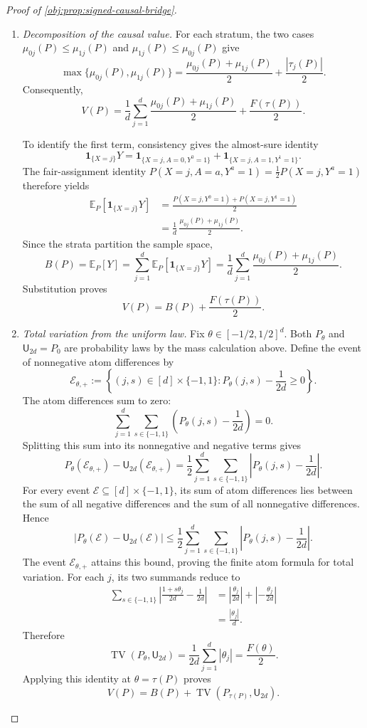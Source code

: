 \begin{proof}[Proof of \cref{obj:prop:signed-causal-bridge}]
\begin{enumerate}
\item \emph{Decomposition of the causal value.}
For each stratum, the two cases
\(\mu_{0j}(P)\le\mu_{1j}(P)\) and
\(\mu_{1j}(P)\le\mu_{0j}(P)\) give
\[
\max\{\mu_{0j}(P),\mu_{1j}(P)\}
=\frac{\mu_{0j}(P)+\mu_{1j}(P)}2
+\frac{|\tau_j(P)|}2.
\]
Consequently,
\[
V(P)
=\frac1d\sum_{j=1}^d
 \frac{\mu_{0j}(P)+\mu_{1j}(P)}2
+\frac{F(\tau(P))}2.
\]

To identify the first term, consistency gives the almost-sure identity
\[
\mathbf1_{\{X=j\}}Y
=\mathbf1_{\{X=j,A=0,Y^0=1\}}
+\mathbf1_{\{X=j,A=1,Y^1=1\}}.
\]
The fair-assignment identity
\(P(X=j,A=a,Y^a=1)=\frac12P(X=j,Y^a=1)\)
therefore yields
\[
\begin{aligned}
\mathbb E_P[\mathbf1_{\{X=j\}}Y]
&=\frac{P(X=j,Y^0=1)+P(X=j,Y^1=1)}2\\
&=\frac1d\,\frac{\mu_{0j}(P)+\mu_{1j}(P)}2.
\end{aligned}
\]
Since the strata partition the sample space,
\[
B(P)=\mathbb E_P[Y]
=\sum_{j=1}^d\mathbb E_P[\mathbf1_{\{X=j\}}Y]
=\frac1d\sum_{j=1}^d
 \frac{\mu_{0j}(P)+\mu_{1j}(P)}2.
\]
Substitution proves
\[
V(P)=B(P)+\frac{F(\tau(P))}2.
\]

\item \emph{Total variation from the uniform law.}
Fix \(\theta\in[-1/2,1/2]^d\). Both \(P_\theta\) and
\(\mathsf U_{2d}=P_0\) are probability laws by the mass calculation above.
Define the event of nonnegative atom differences by
\[
\mathcal E_{\theta,+}
:=\left\{(j,s)\in[d]\times\{-1,1\}:
P_\theta(j,s)-\frac1{2d}\ge0\right\}.
\]
The atom differences sum to zero:
\[
\sum_{j=1}^d\sum_{s\in\{-1,1\}}
\left(P_\theta(j,s)-\frac1{2d}\right)=0.
\]
Splitting this sum into its nonnegative and negative terms gives
\[
P_\theta(\mathcal E_{\theta,+})
-\mathsf U_{2d}(\mathcal E_{\theta,+})
=\frac12\sum_{j=1}^d\sum_{s\in\{-1,1\}}
\left|P_\theta(j,s)-\frac1{2d}\right|.
\]
For every event \(\mathcal E\subseteq[d]\times\{-1,1\}\), its sum of atom
differences lies between the sum of all negative differences and the sum
of all nonnegative differences. Hence
\[
\left|P_\theta(\mathcal E)-\mathsf U_{2d}(\mathcal E)\right|
\le\frac12\sum_{j=1}^d\sum_{s\in\{-1,1\}}
\left|P_\theta(j,s)-\frac1{2d}\right|.
\]
The event \(\mathcal E_{\theta,+}\) attains this bound, proving the finite
atom formula for total variation. For each \(j\), its two summands reduce to
\[
\begin{aligned}
\sum_{s\in\{-1,1\}}
\left|\frac{1+s\theta_j}{2d}-\frac1{2d}\right|
&=\left|\frac{\theta_j}{2d}\right|
+\left|-\frac{\theta_j}{2d}\right|\\
&=\frac{|\theta_j|}{d}.
\end{aligned}
\]
Therefore
\[
\operatorname{TV}(P_\theta,\mathsf U_{2d})
=\frac1{2d}\sum_{j=1}^d|\theta_j|
=\frac{F(\theta)}2.
\]
Applying this identity at \(\theta=\tau(P)\) proves
\[
V(P)=B(P)+\operatorname{TV}(P_{\tau(P)},\mathsf U_{2d}).
\]


\end{enumerate}
\end{proof}
